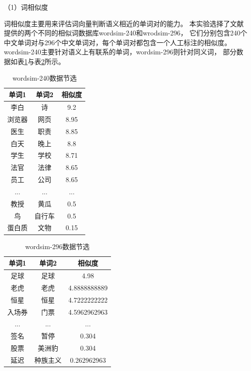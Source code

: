 （1）词相似度

词相似度主要用来评估词向量判断语义相近的单词对的能力。
本实验选择了文献\cite{chen2015joint}提供的两个不同的相似词数据库wordsim-240和wrodsim-296，
它们分别包含240个中文单词对与296个中文单词对，每个单词对都包含一个人工标注的相似度。
wordsim-240主要针对语义上有联系的单词，wordsim-296则针对同义词，
部分数据如表\ref{wordsim-240_form}与表\ref{wordsim-296_form}所示。

\begin{table}[h]
    \caption{wordsim-240数据节选}
    \begin{tabular}{|c|c|c|}
        \hline
        单词1 & 单词2 & 相似度 \\
        \hline
        李白 & 诗 & 9.2 \\
        \hline
        浏览器 & 网页 & 8.95 \\
        \hline
        医生 & 职责 & 8.85 \\
        \hline
        白天 & 晚上 & 8.8 \\
        \hline
        学生 & 学校 & 8.71 \\
        \hline
        法官 & 法律 & 8.65 \\
        \hline
        员工 & 公司 & 8.65 \\
        \hline
        ... & ... & ... \\
        \hline
        教授 & 黄瓜 & 0.5 \\
        \hline
        鸟 & 自行车 & 0.5 \\
        \hline
        蛋白质 & 文物 & 0.15 \\
        \hline
    \end{tabular}
    \label{wordsim-240_form}
    \end{table}

\begin{table}[h]
\caption{wordsim-296数据节选}
\begin{tabular}{|c|c|c|}
    \hline
    单词1 & 单词2 & 相似度 \\
    \hline
    足球 & 足球 & 4.98 \\
    \hline
    老虎 & 老虎 & 4.8888888889 \\
    \hline
    恒星 & 恒星 & 4.7222222222 \\
    \hline
    入场券 & 门票 & 4.5962962963 \\
    \hline
    ... & ... & ... \\
    \hline
    签名 & 暂停 & 0.304 \\
    \hline
    股票 & 美洲豹 & 0.304 \\
    \hline
    延迟 & 种族主义 & 0.262962963 \\
    \hline
\end{tabular}
\label{wordsim-296_form}
\end{table}


